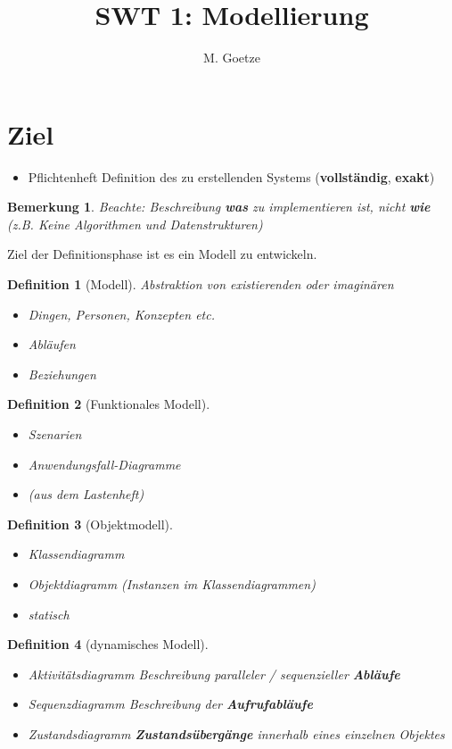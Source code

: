 \documentclass[a4paper]{article}
\title{SWT 1: Modellierung}
\author{M. Goetze}
\theoremstyle{break}
\newtheorem{defi}{Definition}[section]
\newtheorem{ann}{Bemerkung}[section]
\begin{document}
	\maketitle
	\tableofcontents
	\newpage
\section{Ziel}
\begin{itemize}
	\item Pflichtenheft
	\subitem Definition des zu erstellenden Systems (\textbf{vollständig}, \textbf{exakt})
\end{itemize}
\begin{ann}
	Beachte: Beschreibung \textbf{was} zu implementieren ist, nicht \textbf{wie} (z.B. Keine Algorithmen und Datenstrukturen)
\end{ann}

Ziel der Definitionsphase ist es ein Modell zu entwickeln. 

\begin{defi}[Modell]
	Abstraktion von existierenden oder imaginären
	\begin{itemize}
		\item Dingen, Personen, Konzepten etc.
		\item Abläufen
		\item Beziehungen
	\end{itemize}

\end{defi}

\begin{defi}[Funktionales Modell]
	\begin{itemize}
		\item Szenarien
		\item Anwendungsfall-Diagramme
		\item (aus dem Lastenheft)
	\end{itemize}
	
\end{defi} 
\begin{defi}[Objektmodell]
	\begin{itemize}
		\item Klassendiagramm
		\item Objektdiagramm (Instanzen im Klassendiagrammen)
		\item statisch
	\end{itemize}
\end{defi}
\begin{defi}[dynamisches Modell]
	\begin{itemize}
	\item Aktivitätsdiagramm
	\subitem Beschreibung paralleler / sequenzieller \textbf{Abläufe}
	\item Sequenzdiagramm
	\subitem Beschreibung der \textbf{Aufrufabläufe}
	\item Zustandsdiagramm
	\subitem \textbf{Zustandsübergänge} innerhalb eines einzelnen Objektes
\end{itemize}
\end{defi} 
\end{document}
